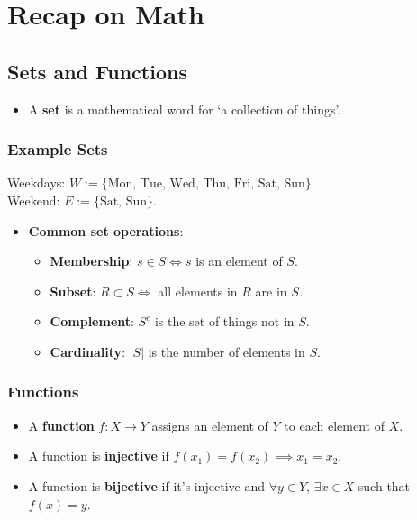 \section{Recap on Math}
\subsection{Sets and Functions}

\begin{itemize}
    \item A \textbf{set} is a mathematical word for ‘a collection of things’.
\end{itemize}

\subsubsection{Example Sets}
Weekdays: \( W := \{ \text{Mon, Tue, Wed, Thu, Fri, Sat, Sun} \} \). \\
Weekend: \( E := \{ \text{Sat, Sun} \} \).


\begin{itemize}
    \item \textbf{Common set operations}:
          \begin{itemize}
              \item \textbf{Membership}: \( s \in S \iff s \) is an element of \( S \).
              \item \textbf{Subset}: \( R \subset S \iff \) all elements in \( R \) are in \( S \).
              \item \textbf{Complement}: \( S^c \) is the set of things not in \( S \).
              \item \textbf{Cardinality}: \( |S| \) is the number of elements in \( S \).
          \end{itemize}
\end{itemize}



\subsubsection{Functions}

\begin{itemize}
    \item A \textbf{function} \( f: X \to Y \) assigns an element of \( Y \) to each element of \( X \).
    \item A function is \textbf{injective} if \( f(x_1) = f(x_2) \implies x_1 = x_2 \).
    \item A function is \textbf{bijective} if it’s injective and \( \forall y \in Y \), \( \exists x \in X \) such that \( f(x) = y \).
\end{itemize}


